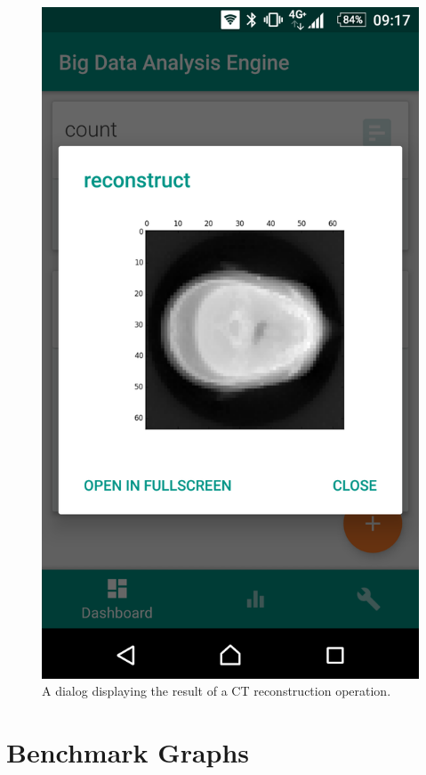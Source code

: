 \begin{figure}[h!]
\begin{minipage}[b]{0.4\textwidth}
    		\includegraphics[width=\textwidth]{img/result.png}
    		\caption[]{A dialog displaying the result of a CT reconstruction operation.}
  	\end{minipage}
\end{figure}

\chapter{Benchmark Graphs}
